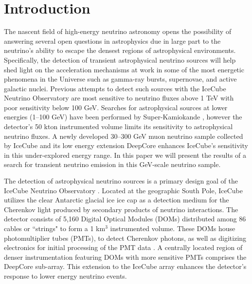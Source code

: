 \documentclass[manuscript]{aastex}
\begin{document}
\section{Introduction}
The nascent field of high-energy neutrino astronomy opens the possibility of answering several open questions in astrophysics due in large part to the neutrino's ability to escape the densest regions of astrophysical environments. Specifically, the detection of transient astrophysical neutrino sources will help shed light on the acceleration mechanisms at work in some of the most energetic phenomena in the Universe such as gamma-ray bursts, supernovae, and active galactic nuclei. Previous attempts to detect such sources with the IceCube Neutrino Observatory \citep{2006APh....26..155I} are most sensitive to neutrino fluxes above 1 TeV with poor sensitivity below 100 GeV. Searches for astrophysical sources at lower energies (1--100 GeV) have been performed by Super-Kamiokande \citep{2009ApJ...704..503T}, however the detector's 50 kton instrumented volume limits its sensitivity to astrophysical neutrino fluxes. A newly developed 30--300 GeV muon neutrino sample collected by IceCube and its low energy extension DeepCore \citep{2012APh....35..615A} enhances IceCube's sensitivity in this under-explored energy range. In this paper we will present the results of a search for transient neutrino emission in this GeV-scale neutrino sample.

The detection of astrophysical neutrino sources is a primary design goal of the IceCube Neutrino Observatory \citep{2006APh....26..155I}. Located at the geographic South Pole, IceCube utilizes the clear Antarctic glacial ice ice cap as a detection medium for the Cherenkov light produced by secondary products of neutrino interactions. The detector consists of 5,160 Digital Optical Modules (DOMs) distributed among 86 cables or ``strings" to form a 1 km$^3$ instrumented volume. These DOMs house photomultiplier tubes (PMTs), to detect Cherenkov photons, as well as digitizing electronics for initial processing of the PMT data \citep{2009NIMPA.601..294A}. A centrally located region of denser instrumentation featuring DOMs with more sensitive PMTs comprises the DeepCore sub-array. This extension to the IceCube array enhances the detector's response to lower energy neutrino events.
\end{document}
